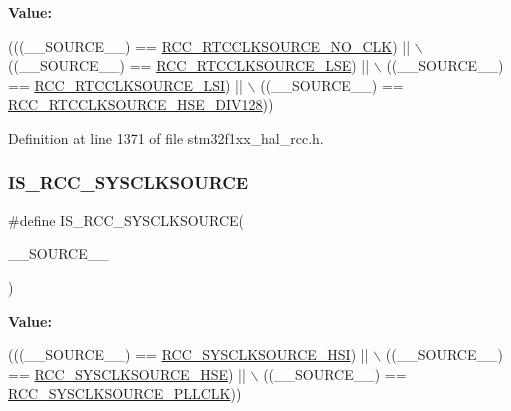 {\bfseries Value\+:}
\begin{DoxyCode}
(((\_\_SOURCE\_\_) == \hyperlink{group___r_c_c___r_t_c___clock___source_gacce0b2f54d103340d8c3a218e86e295d}{RCC\_RTCCLKSOURCE\_NO\_CLK}) || \(\backslash\)
                                          ((\_\_SOURCE\_\_) == \hyperlink{group___r_c_c___r_t_c___clock___source_ga5dca8d63f250a20bd6bc005670d0c150}{RCC\_RTCCLKSOURCE\_LSE}) || \(\backslash\)
                                          ((\_\_SOURCE\_\_) == \hyperlink{group___r_c_c___r_t_c___clock___source_gab47a1afb8b5eef9f20f4772961d0a5f4}{RCC\_RTCCLKSOURCE\_LSI}) || \(\backslash\)
                                          ((\_\_SOURCE\_\_) == 
      \hyperlink{group___r_c_c___r_t_c___clock___source_ga7e022374ec3ceffa94e5bb6310c35c83}{RCC\_RTCCLKSOURCE\_HSE\_DIV128}))
\end{DoxyCode}


Definition at line 1371 of file stm32f1xx\+\_\+hal\+\_\+rcc.\+h.

\mbox{\label{group___r_c_c___private___macros_ga7dc6fce00c2191e691fb2b17dd176d65}} 
\subsubsection{\texorpdfstring{I\+S\+\_\+\+R\+C\+C\+\_\+\+S\+Y\+S\+C\+L\+K\+S\+O\+U\+R\+CE}{IS\_RCC\_SYSCLKSOURCE}}
{\footnotesize\ttfamily \#define I\+S\+\_\+\+R\+C\+C\+\_\+\+S\+Y\+S\+C\+L\+K\+S\+O\+U\+R\+CE(\begin{DoxyParamCaption}\item[{}]{\+\_\+\+\_\+\+S\+O\+U\+R\+C\+E\+\_\+\+\_\+ }\end{DoxyParamCaption})}

{\bfseries Value\+:}
\begin{DoxyCode}
(((\_\_SOURCE\_\_) == \hyperlink{group___r_c_c___system___clock___source_gaaeeb699502e7d7a9f1b5d57fcf1f5095}{RCC\_SYSCLKSOURCE\_HSI}) || \(\backslash\)
                                         ((\_\_SOURCE\_\_) == \hyperlink{group___r_c_c___system___clock___source_ga9116d0627e1e7f33c48e1357b9a35a1c}{RCC\_SYSCLKSOURCE\_HSE}) || \(\backslash\)
                                         ((\_\_SOURCE\_\_) == 
      \hyperlink{group___r_c_c___system___clock___source_ga5caf08ac71d7dd7e7b2e3e421606aca7}{RCC\_SYSCLKSOURCE\_PLLCLK}))
\end{DoxyCode}


